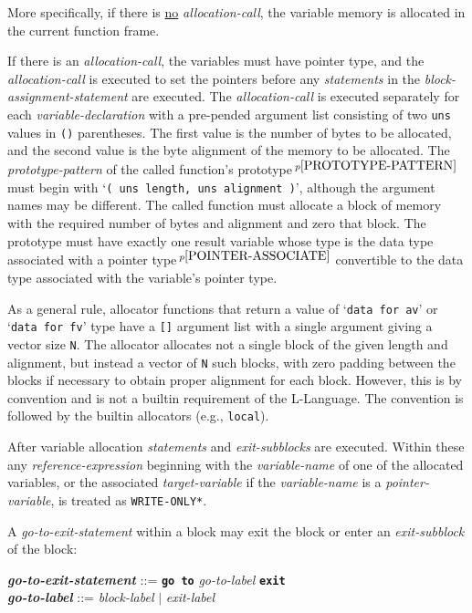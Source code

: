 \documentclass[12pt]{article}
\newcommand{\TT}[1]{{\tt \bfseries #1}}
\newcommand{\ttkey}[1]{{\tt \bfseries #1}}
\newcommand{\emkey}[1]{{\em \bfseries #1}}
\newcommand{\pagnote}[1]{$\,^{p\pageref{#1}}$}
\newenvironment{indpar}[1][0.3in]%
	{\begin{list}{}%
		     {\setlength{\itemsep}{0in}%
		      \setlength{\topsep}{0in}%
		      \setlength{\parsep}{1ex}%
		      \setlength{\labelwidth}{#1}%
		      \setlength{\leftmargin}{#1}%
		      \addtolength{\leftmargin}{\labelsep}}%
	 \item}%
	{\end{list}}
\begin{document}
More specifically, if there is \underline{no} {\em allocation-call},
the variable memory is allocated in the
current function frame.

If there is an {\em allocation-call}, the variables must have pointer
type, and the {\em allocation-call} is executed to set the pointers
before any {\em statements} in the {\em block-assignment-statement}
are executed.  The {\em allocation-call} is executed
separately for each {\em variable-declaration}
with a pre-pended argument list consisting of two {\tt uns} values
in {\tt ()} parentheses.  The first value is the number of bytes to
be allocated, and the second value is the byte alignment of the
memory to be allocated.
The {\em prototype-pattern}
of the called function's prototype\pagnote{PROTOTYPE-PATTERN}
must begin with `{\tt ( uns length, uns alignment )}', although
the argument names may be different.
The called function must allocate a block of
memory with the required number of bytes and alignment and zero that
block.  The prototype must have
exactly one result variable whose type is the data type associated
with a pointer type\pagnote{POINTER-ASSOCIATE}
convertible to the data type associated with the variable's pointer type.

As a general rule, allocator functions that return a value of
`{\tt data for av}' or `{\tt data for fv}' type
have a {\tt []} argument list
with a single argument giving a vector size {\tt N}.
The allocator allocates not a single block of the given length
and alignment, but instead a vector of {\tt N} such blocks, with zero padding
between the blocks if necessary to obtain proper alignment for each
block.  However,
this is by convention and is not a builtin requirement of the L-Language.
The convention is followed by the builtin allocators (e.g., {\tt local}).


After variable allocation 
{\em statements} and {\em exit-subblocks}
are executed.
Within these
any {\em reference-expression} beginning with the {\em variable-name}
of one of the allocated variables, or the associated
{\em target-variable} if the {\em variable-name} is a
{\em pointer-variable}, is treated as {\tt *WRITE-ONLY*}.

A {\em go-to-exit-statement} within a block may exit the block or
enter an {\em exit-subblock} of the block:
\begin{indpar}
\emkey{go-to-exit-statement}\label{GO-TO-STATEMENT} ::=
    \ttkey{go to} {\em go-to-label} \TT{exit}
\\[0.5ex]
\emkey{go-to-label} ::= {\em block-label} $|$ {\em exit-label}
\end{indpar}
\end{document}

